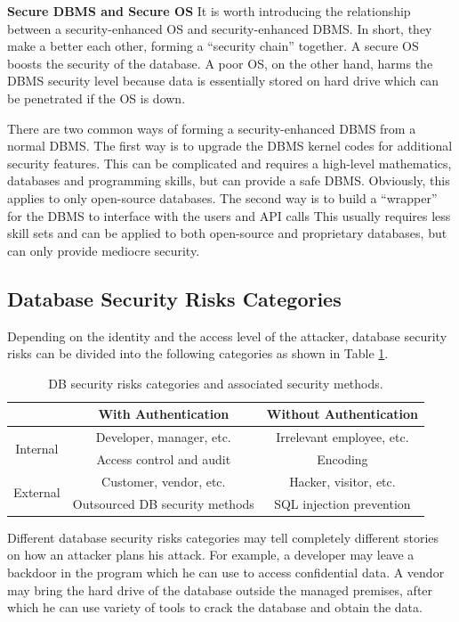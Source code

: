 \begin{mdframed}
\noindent \textbf{Secure DBMS and Secure OS}
It is worth introducing the relationship between a security-enhanced OS and security-enhanced DBMS. In short, they make a better each other, forming a ``security chain'' together. A secure OS boosts the security of the database. A poor OS, on the other hand, harms the DBMS security level because data is essentially stored on hard drive which can be penetrated if the OS is down.

There are two common ways of forming a security-enhanced DBMS from a normal DBMS. The first way is to upgrade the DBMS kernel codes for additional security features. This can be complicated and requires a high-level mathematics, databases and programming skills, but can provide a safe DBMS. Obviously, this applies to only open-source databases. The second way is to build a ``wrapper'' for the DBMS to interface with the users and API calls This usually requires less skill sets and can be applied to both open-source and proprietary databases, but can only provide mediocre security.
\end{mdframed}

\subsection{Database Security Risks Categories}

Depending on the identity and the access level of the attacker, database security risks can be divided into the following categories as shown in Table \ref{ch:securityaccessories:tab:dbsecurityriskscategories}.
\begin{table}
	\centering \caption{DB security risks categories and associated security methods.} \label{ch:securityaccessories:tab:dbsecurityriskscategories}
	\begin{tabular}{|c|c|c|}
		\hline
			& With Authentication & Without Authentication \\ \hline
		\multirow{2}{*}{Internal} & Developer, manager, etc. & Irrelevant employee, etc. \\
		& Access control and audit & Encoding \\ \hline
		\multirow{2}{*}{External} & Customer, vendor, etc. & Hacker, visitor, etc. \\
		& Outsourced DB security methods & SQL injection prevention \\
		\hline
	\end{tabular}
\end{table}
Different database security risks categories may tell completely different stories on how an attacker plans his attack. For example, a developer may leave a backdoor in the program which he can use to access confidential data. A vendor may bring the hard drive of the database outside the managed premises, after which he can use variety of tools to crack the database and obtain the data.

